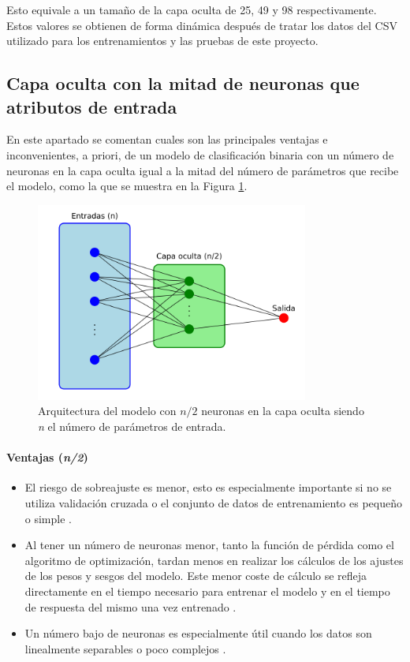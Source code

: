 Esto equivale a un tamaño de la capa oculta de 25, 49 y 98 respectivamente. Estos valores se obtienen de forma dinámica después de tratar los datos del CSV utilizado para los entrenamientos y las pruebas de este proyecto.



\subsection{Capa oculta con la mitad de neuronas que atributos de entrada}\label{sec:VIBIN25}
En este apartado se comentan cuales son las principales ventajas e inconvenientes, a priori, de un modelo de clasificación binaria con un número de neuronas en la capa oculta igual a la mitad del número de parámetros que recibe el modelo, como la que se muestra en la Figura \ref{fig:arqnmediosBIN}.

\begin{figure}[H]
    \centering
    \includegraphics[width=0.8\textwidth]{./img/modelo/arquitecturas/arqnmediosBIN.pdf}
    \caption{Arquitectura del modelo con $n/2$ neuronas en la capa oculta siendo \textit{n} el número de parámetros de entrada.}
    \label{fig:arqnmediosBIN}
\end{figure}

\paragraph{Ventajas (\textit{n/2})}
\begin{itemize}
	\item El riesgo de sobreajuste es menor, esto es especialmente importante si no se utiliza validación cruzada o el conjunto de datos de entrenamiento es pequeño o simple \cite{chollet2017deep}.
	\item  Al tener un número de neuronas menor, tanto la función  de pérdida como el algoritmo de optimización, tardan menos en realizar los cálculos de los ajustes de los pesos y sesgos del modelo. Este menor coste de cálculo se refleja directamente en el tiempo necesario para entrenar el modelo y en el tiempo de respuesta del mismo una vez entrenado \cite{goodfellow2016deep}.
	\item Un número bajo de neuronas es especialmente útil cuando los datos son linealmente separables o poco complejos \cite{ruck1996hidden}.
\end{itemize}
